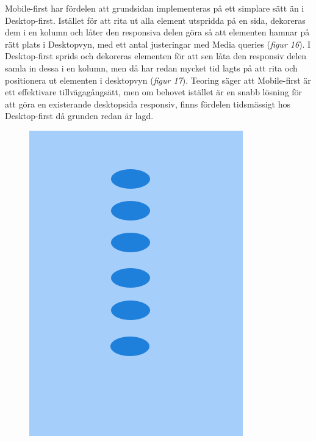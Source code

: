 \documentclass[11pt]{article}
\begin{document}
Mobile-first har fördelen att grundsidan implementeras på ett simplare sätt än i Desktop-first. Istället för att rita ut alla element utspridda på en sida, dekoreras dem i en kolumn och låter den responsiva delen göra så att elementen hamnar på rätt plats i Desktopvyn, med ett antal justeringar med Media queries (\textit{figur 16}). I Desktop-first sprids och dekoreras elementen för att sen låta den responsiv delen samla in dessa i en kolumn, men då har redan mycket tid lagts på att rita och positionera ut elementen i desktopvyn (\textit{figur 17}). Teoring säger att Mobile-first är ett effektivare tillvägagångsätt, men om behovet istället är en snabb lösning för att göra en existerande desktopsida responsiv, finns fördelen tidsmässigt hos Desktop-first då grunden redan är lagd.
\\
\begin{figure}[H]
\centerline{%
\includegraphics[scale=0.27]{pics/mobiledots.png}\hspace{2em}%
}
\end{figure}
\end{document}
